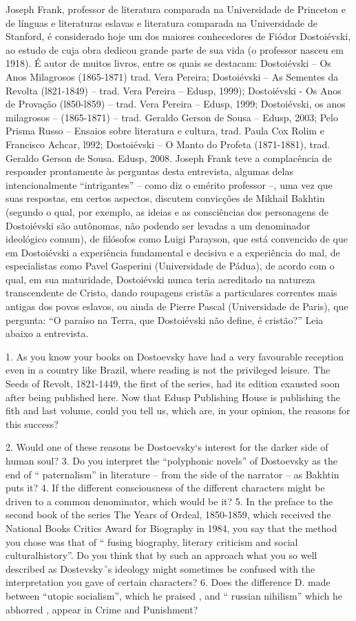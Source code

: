 Joseph Frank, professor de literatura comparada na Universidade de
Princeton e de línguas e literaturas eslavas e literatura comparada na
Universidade de Stanford, é considerado hoje um dos maiores conhecedores
de Fiódor Dostoiévski, ao estudo de cuja obra dedicou grande parte de
sua vida (o professor nasceu em 1918). É autor de muitos livros, entre
os quais se destacam: Dostoiévski -- Os Anos Milagrosos (1865-1871)
trad. Vera Pereira; Dostoiévski -- As Sementes da Revolta (l821-1849) --
trad. Vera Pereira -- Edusp, 1999); Dostoiévski - Os Anos de Provação
(l850-l859) -- trad. Vera Pereira -- Edusp, 1999; Dostoiévski, os anos
milagrosos -- (1865-1871) -- trad. Geraldo Gerson de Sousa -- Edusp,
2003; Pelo Prisma Russo -- Ensaios sobre literatura e cultura, trad.
Paula Cox Rolim e Francisco Achcar, l992; Dostoiévski -- O Manto do
Profeta (1871-1881), trad. Geraldo Gerson de Sousa. Edusp, 2008. Joseph
Frank teve a complacência de responder prontamente às perguntas desta
entrevista, algumas delas intencionalmente ``intrigantes'' -- como diz o
emérito professor --, uma vez que suas respostas, em certos aspectos,
discutem convicções de Mikhail Bakhtin (segundo o qual, por exemplo, as
ideias e as consciências dos personagens de Dostoiévski são autônomas,
não podendo ser levadas a um denominador ideológico comum), de filósofos
como Luigi Parayson, que está convencido de que em Dostoiévski a
experiência fundamental e decisiva e a experiência do mal, de
especialistas como Pavel Gasperini (Universidade de Pádua), de acordo
com o qual, em sua maturidade, Dostoiévski nunca teria acreditado na
natureza transcendente de Cristo, dando roupagens cristãs a particulares
correntes mais antigas dos povos eslavos, ou ainda de Pierre Pascal
(Universidade de Paris), que pergunta: ``O paraíso na Terra, que
Dostoiévski não define, é cristão?'' Leia abaixo a entrevista.

1. As you know your books on Dostoevsky have had a very favourable
reception even in a country like Brazil, where reading is not the
privileged leisure. The Seeds of Revolt, 1821-1449, the first of the
series, had its edition exausted soon after being published here. Now
that Edusp Publishing House is publishing the fith and last volume,
could you tell us, which are, in your opinion, the reasons for this
success?

2. Would one of these reasons be Dostoevsky`s interest for the darker
side of human soul? 3. Do you interpret the ``polyphonic novels'' of
Dostoevsky as the end of `` paternalism'' in literature -- from the side
of the narrator -- as Bakhtin puts it? 4. If the different consciousness
of the different characters might be driven to a common denominator,
which would be it? 5. In the preface to the second book of the series
The Years of Ordeal, 1850-1859, which received the National Books
Critics Award for Biography in 1984, you say that the method you chose
was that of `` fusing biography, literary criticism and social
culturalhistory''. Do you think that by such an approach what you so
well described as Dostevsky´s ideology might sometimes be confused with
the interpretation you gave of certain characters? 6. Does the
difference D. made between ``utopic socialism'', which he praised , and
`` russian nihilism'' which he abhorred , appear in Crime and
Punishment?

